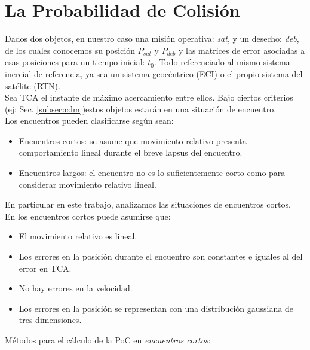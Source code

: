 \section{La Probabilidad de Colisi\'on}

Dados dos objetos, en nuestro caso una misi\'on operativa: {\it{sat}}, y un desecho: {\it{deb}}, de los cuales conocemos su posici\'on $P_{sat}$ y $P_{deb}$ y las matrices de error asociadas a esas posiciones para un tiempo inicial: $t_{0}$. Todo referenciado al mismo sistema inercial de referencia, ya sea un sistema geoc\'entrico (\ac{ECI}) o el propio sistema del sat\'elite (\ac{RTN}).\\
Sea TCA el instante de m\'aximo acercamiento entre ellos. Bajo ciertos criterios (ej: Sec. \ref{subsec:cdm})estos objetos estar\'an en una situaci\'on de encuentro.\\

Los encuentros pueden clasificarse seg\'un sean:

\begin{itemize}
 \item Encuentros cortos: se asume que movimiento relativo presenta comportamiento lineal durante el breve lapsus del encuentro.
 \item Encuentros largos: el encuentro no es lo suficientemente corto como para considerar movimiento relativo lineal.
\end{itemize}

En particular en este trabajo, analizamos las situaciones de encuentros cortos.\\
En los encuentros cortos puede asumirse que:\\

\begin{itemize}
\itemsep0em
 \item El movimiento relativo es lineal.
 \item Los errores en la posici\'on durante el encuentro son constantes e iguales al del error en TCA.
 \item No hay errores en la velocidad.
 \item Los errores en la posici\'on se representan con una distribuci\'on gaussiana de tres dimensiones.
\end{itemize}

M\'etodos para el c\'alculo de la PoC en {\it{encuentros cortos}}:

